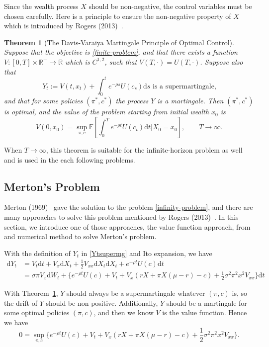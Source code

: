 \documentclass[a4paper]{article}
\newtheorem{theorem}{Theorem}[section]
\theoremstyle{definition}
\numberwithin{equation}{section}
\begin{document}
Since the wealth process $X$ should be non-negative, the control variables must be chosen carefully. Here is a principle to ensure the non-negative property of $X$ which is introduced by Rogers (2013)~\cite{book3}.
\begin{theorem}[The Davis-Varaiya Martingale Principle of Optimal Control]\label{th:davis}
Suppose that the objective is \eqref{finite-problem}, and that there exists a function $V:[0,T]\times\mathbb R^+\rightarrow\mathbb R$ which is $C^{1,2}$, such that $V(T,\cdot)=U(T,\cdot)$. Suppose also that
\begin{equation}\label{Ytsupermg}
Y_t:=V(t,x_t)+\int^t_0e^{-\rho s}U(c_s)\mathrm ds\text{ is a supermartingale,}
\end{equation}
and that for some policies $(\pi^*,c^*)$ the process $Y$ is a martingale. Then $(\pi^*,c^*)$ is optimal, and the value of the problem starting from initial wealth $x_0$ is 
$$V(0,x_0)=\sup_{\pi,c}\mathbb E[\int^T_0e^{-\rho t}U(c_t)\mathrm dt\lvert X_0=x_0],\qquad T\rightarrow\infty.$$
\end{theorem}
When $T\rightarrow\infty$, this theorem is suitable for the infinite-horizon problem as well and is used in the each following problems.

\subsection{Merton's Problem}\label{sec:merton}
Merton (1969)~\cite{merton} gave the solution to the problem \eqref{infinity-problem}, and there are many approaches to solve this problem mentioned by Rogers (2013)~\cite{book3}. In this section, we introduce one of those approaches, the value function approach, from~\cite{book3} and numerical method to solve Merton's problem.

With the definition of $Y_t$ in \eqref{Ytsupermg} and Ito expansion, we have
\begin{equation}
\begin{aligned}
\mathrm dY_t&=V_t\mathrm dt+V_x\mathrm dX_t+\frac{1}{2}V_{xx}\mathrm dX_t\mathrm dX_t+e^{-\rho t}U(c)\mathrm dt\\
&=\sigma\pi V_x\mathrm dW_t+\{e^{-\rho t}U(c)+V_t+V_x(rX+\pi X(\mu-r)-c)+\frac{1}{2}\sigma^2\pi^2x^2V_{xx}\}\mathrm dt
\end{aligned}
\end{equation}

With Theorem~\ref{th:davis}, $Y$ should always be a supermartingale whatever $(\pi,c)$ is, so the drift of $Y$ should be non-positive. Additionally, $Y$ should be a martingale for some optimal policies $(\pi,c)$, and then we know $V$ is the value function. Hence we have
\begin{equation}\label{hjb:merton}
0=\sup_{\pi,c}\{e^{-\rho t}U(c)+V_t+V_x(rX+\pi X(\mu-r)-c)+\frac{1}{2}\sigma^2\pi^2x^2V_{xx}\}.
\end{equation}
\end{document}
